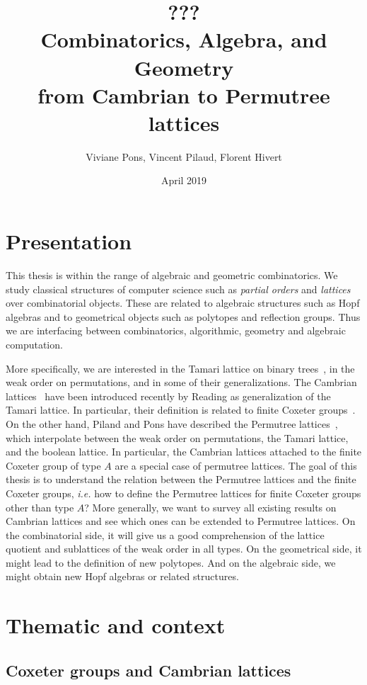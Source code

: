 \documentclass[a4paper,12pt]{article}
\title{\huge \bf ???  \\ Combinatorics, Algebra, and Geometry \\ from Cambrian to Permutree lattices}
\author{Viviane Pons, Vincent Pilaud, Florent Hivert}
\date{April 2019}
\begin{document}
\maketitle

\section{Presentation}

This thesis is within the range of algebraic and geometric combinatorics. We study classical structures of computer science such as \emph{partial orders} and \emph{lattices} over combinatorial objects. These are related to algebraic structures such as Hopf algebras and to geometrical objects such as polytopes and reflection groups. Thus we are interfacing between combinatorics, algorithmic, geometry and algebraic computation.

More specifically, we are interested in the Tamari lattice on binary trees~\cite{Tamari, HuangTamari, TamariFestschrift}, in the weak order on permutations, and in some of their generalizations. The Cambrian lattices~\cite{Reading-cambrianLattices} have been introduced recently by Reading as generalization of the Tamari lattice. In particular, their definition is related to finite Coxeter groups~\cite{Reading-FiniteCoxeterGroupsChapter}. On the other hand, Piland and Pons have described the Permutree lattices~\cite{PilaudPons-permutrees}, which interpolate between the weak order on permutations, the Tamari lattice, and the boolean lattice. In particular, the Cambrian lattices attached to the finite Coxeter group of type $A$ are a special case of permutree lattices. The goal of this thesis is to understand the relation between the Permutree lattices and the finite Coxeter groups, \emph{i.e.} how to define the Permutree lattices for finite Coxeter groups other than type $A$? More generally, we want to survey all existing results on Cambrian lattices and see which ones can be extended to Permutree lattices. On the combinatorial side, it will give us a good comprehension of the lattice quotient and sublattices of the weak order in all types. On the geometrical side, it might lead to the definition of new polytopes. And on the algebraic side, we might obtain new Hopf algebras or related structures.

\section{Thematic and context}

\subsection{Coxeter groups and Cambrian lattices}
\end{document}

